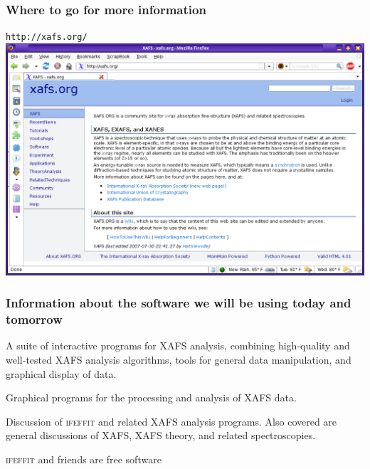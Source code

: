 \documentclass[10pt, xcolor=x11names, compress, handout]{beamer}
\begin{document}
\begin{frame}
  \frametitle{Where to go for more information}
  \begin{center}
    {\LARGE \texttt{http://xafs.org/}}\\[1ex]
    \includegraphics[width=\linewidth]{images/xafsorg.png}
  \end{center}
\end{frame}

\begin{frame}
  \frametitle{Information about the software we will be using today
    and tomorrow}
  \begin{description}[Ifeffit]
  \item[Ifeffit] A suite of interactive programs for XAFS analysis,
    combining high-quality and well-tested XAFS analysis algorithms,
    tools for general data manipulation, and graphical display of
    data.\\
  \item[Athena \& Artemis] Graphical programs for the processing and
    analysis of XAFS data.\\
  \item[The Ifeffit mailing list] Discussion of \textsc{ifeffit} and
    related XAFS analysis programs.  Also covered are general
    discussions of XAFS, XAFS theory, and related
    spectroscopies.\\
  \end{description}

  \begin{block}{}
    \begin{center}
      \textsc{ifeffit} and friends are free software
    \end{center}
  \end{block}

\end{frame}

\end{document}
